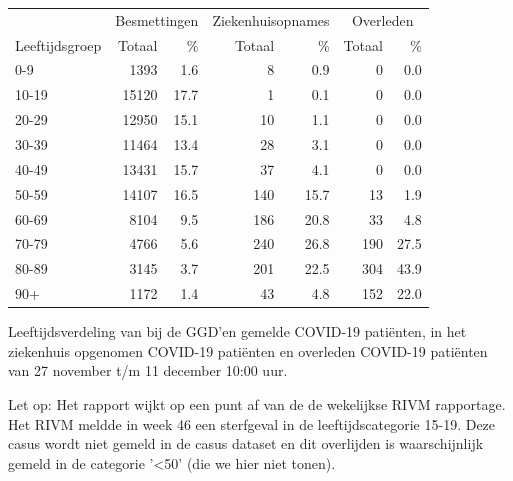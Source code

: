\documentclass[
  english,
  man,floatsintext]{apa6}
\begin{document}
\begin{table}[H]
\centering\begingroup\fontsize{11}{13}\selectfont

\begin{threeparttable}
\begin{tabular}{lrrrrrr}
\toprule
\multicolumn{1}{c}{ } & \multicolumn{2}{c}{Besmettingen} & \multicolumn{2}{c}{Ziekenhuisopnames} & \multicolumn{2}{c}{Overleden} \\
\cmidrule(l{3pt}r{3pt}){2-3} \cmidrule(l{3pt}r{3pt}){4-5} \cmidrule(l{3pt}r{3pt}){6-7}
Leeftijdsgroep & Totaal & \% & Totaal & \% & Totaal & \%\\
\midrule
0-9 & 1393 & 1.6 & 8 & 0.9 & 0 & 0.0\\
10-19 & 15120 & 17.7 & 1 & 0.1 & 0 & 0.0\\
20-29 & 12950 & 15.1 & 10 & 1.1 & 0 & 0.0\\
30-39 & 11464 & 13.4 & 28 & 3.1 & 0 & 0.0\\
40-49 & 13431 & 15.7 & 37 & 4.1 & 0 & 0.0\\
50-59 & 14107 & 16.5 & 140 & 15.7 & 13 & 1.9\\
60-69 & 8104 & 9.5 & 186 & 20.8 & 33 & 4.8\\
70-79 & 4766 & 5.6 & 240 & 26.8 & 190 & 27.5\\
80-89 & 3145 & 3.7 & 201 & 22.5 & 304 & 43.9\\
90+ & 1172 & 1.4 & 43 & 4.8 & 152 & 22.0\\
\bottomrule
\end{tabular}
\begin{tablenotes}
\item[1] Leeftijdsverdeling van bij de GGD’en gemelde COVID-19 patiënten, in het ziekenhuis opgenomen COVID-19 patiënten en overleden COVID-19 patiënten van 27 november t/m 11 december 10:00 uur.
\item[2] Let op: Het rapport wijkt op een punt af van de de wekelijkse RIVM rapportage. Het RIVM meldde in week 46 een sterfgeval in de leeftijdscategorie 15-19. Deze casus wordt niet gemeld in de casus dataset en dit overlijden is waarschijnlijk gemeld in de categorie '<50' (die we hier niet tonen).
\end{tablenotes}
\end{threeparttable}
\endgroup{}
\end{table}

\newpage
\end{document}
